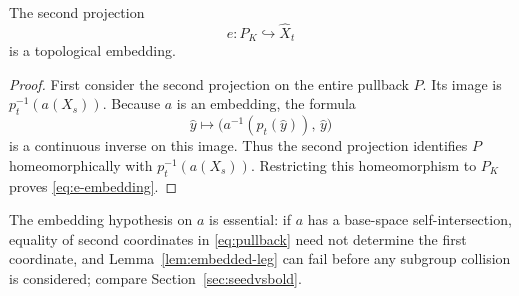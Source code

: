 \begin{lemma}\label{lem:embedded-leg}
The second projection
\begin{equation}\label{eq:e-embedding}
  e\colon P_K\hookrightarrow\widehat X_t
\end{equation}
is a topological embedding.
\end{lemma}

\begin{proof}
First consider the second projection on the entire pullback \( P \).  Its image is \( p_t^{-1}(a(X_s)) \).  Because \( a \) is an embedding, the formula
\begin{equation}\label{eq:e-inverse}
  \widehat y\longmapsto\bigl(a^{-1}(p_t(\widehat y)),\,\widehat y\bigr)
\end{equation}
is a continuous inverse on this image.  Thus the second projection identifies \( P \) homeomorphically with \( p_t^{-1}(a(X_s)) \).  Restricting this homeomorphism to \( P_K \) proves \eqref{eq:e-embedding}.
\end{proof}

\begin{remark}
The embedding hypothesis on \( a \) is essential: if \( a \) has a
base-space self-intersection, equality of second coordinates in
\eqref{eq:pullback} need not determine the first coordinate, and
Lemma~\ref{lem:embedded-leg} can fail before any subgroup collision is
considered; compare Section~\ref{sec:seedvsbold}.
\end{remark}